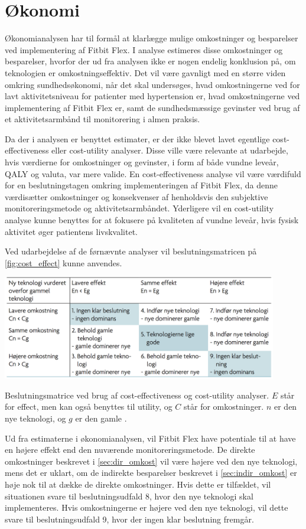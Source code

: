 \section{Økonomi} \label{sec:dis_oekonomi}
Økonomianalysen har til formål at klarlægge mulige omkostninger og besparelser ved implementering af Fitbit Flex. I analyse estimeres disse omkostninger og besparelser, hvorfor der ud fra analysen ikke er nogen endelig konklusion på, om teknologien er omkostningseffektiv. Det vil være gavnligt med en større viden omkring sundhedsøkonomi, når det skal undersøges, hvad omkostningerne ved for lavt aktivitetsniveau for patienter med hypertension er, hvad omkostningerne ved implementering af Fitbit Flex er, samt de sundhedsmæssige gevinster ved brug af et aktivitetsarmbånd til monitorering i almen praksis. 

Da der i analysen er benyttet estimater, er der ikke blevet lavet egentlige cost-effectiveness eller cost-utility analyser. Disse ville være relevante at udarbejde, hvis værdierne for omkostninger og gevinster, i form af både vundne leveår, QALY og valuta, var mere valide. En cost-effectiveness analyse vil være værdifuld for en beslutningstagen omkring implementeringen af Fitbit Flex, da denne værdisætter omkostninger og konsekvenser af henholdsvis den subjektive monitoreringsmetode og aktivitetsarmbåndet. Yderligere vil en cost-utility analyse kunne benyttes for at fokusere på kvaliteten af vundne leveår, hvis fysisk aktivitet øger patientens livskvalitet.

Ved udarbejdelse af de førnævnte analyser vil beslutningsmatricen på \autoref{fig:cost_effect} kunne anvendes. 

\begin{table}[H]
	\centering
	\includegraphics[width=0.9\textwidth]{figures/cost-effectiveness}
	\caption{Beslutningsmatrice ved brug af cost-effectiveness og cost-utility analyser. $E$ står for effect, men kan også benyttes til utility, og $C$ står for omkostninger. $n$ er den nye teknologi, og $g$ er den gamle \citep{mtvhaandbog}.}
	\label{fig:cost_effect}
\end{table}

\noindent
Ud fra estimaterne i økonomianalysen, vil Fitbit Flex have potentiale til at have en højere effekt end den nuværende monitoreringsmetode. De direkte omkostninger beskrevet i \autoref{sec:dir_omkost} vil være højere ved den nye teknologi, mens det er uklart, om de indirekte besparelser beskrevet i \autoref{sec:indir_omkost} er høje nok til at dække de direkte omkostninger. Hvis dette er tilfældet, vil situationen svare til beslutningsudfald 8, hvor den nye teknologi skal implementeres. Hvis omkostningerne er højere ved den nye teknologi, vil dette svare til beslutningsudfald 9, hvor der ingen klar beslutning fremgår. 